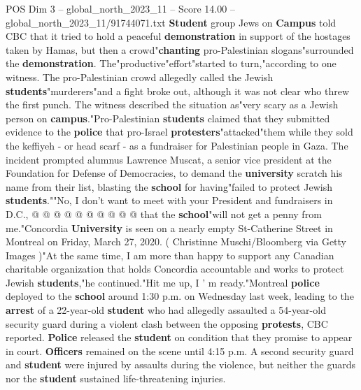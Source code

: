 \begin{textsample}{POS Dim 3 – global\_north\_2023\_11 – Score 14.00 – global\_north\_2023\_11/91744071.txt}  \label{ex:f3_pos_184}
\textbf{Student} group Jews on \textbf{Campus} told CBC that it tried to hold a peaceful \textbf{demonstration} in support of the hostages taken by Hamas, but then a crowd"\textbf{chanting} pro-Palestinian slogans"surrounded the \textbf{demonstration}.
The"productive"effort"started to turn,"according to one witness.
The pro-Palestinian crowd allegedly called the Jewish \textbf{students}"murderers"and a fight broke out, although it was not clear who threw the first punch.
The witness described the situation as"very scary as a Jewish person on \textbf{campus}."Pro-Palestinian \textbf{students} claimed that they submitted evidence to the \textbf{police} that pro-Israel \textbf{protesters}"attacked"them while they sold the keffiyeh - or head scarf - as a fundraiser for Palestinian people in Gaza.
The incident prompted alumnus Lawrence Muscat, a senior vice president at the Foundation for Defense of Democracies, to demand the \textbf{university} scratch his name from their list, blasting the \textbf{school} for having"failed to protect Jewish \textbf{students}.""No, I don't want to meet with your President and fundraisers in D.C., @ @ @ @ @ @ @ @ @ @ that the \textbf{school}"will not get a penny from me."Concordia \textbf{University} is seen on a nearly empty St-Catherine Street in Montreal on Friday, March 27, 2020. ( Christinne Muschi/Bloomberg via Getty Images )"At the same time, I am more than happy to support any Canadian charitable organization that holds Concordia accountable and works to protect Jewish \textbf{students},"he continued."Hit me up, I ' m ready."Montreal \textbf{police} deployed to the \textbf{school} around 1:30 p.m. on Wednesday last week, leading to the \textbf{arrest} of a 22-year-old \textbf{student} who had allegedly assaulted a 54-year-old security guard during a violent clash between the opposing \textbf{protests}, CBC reported. \textbf{Police} released the \textbf{student} on condition that they promise to appear in court. \textbf{Officers} remained on the scene until 4:15 p.m.
A second security guard and \textbf{student} were injured by assaults during the violence, but neither the guards nor the \textbf{student} sustained life-threatening injuries.

\end{textsample}
